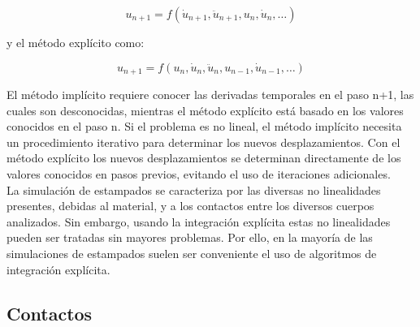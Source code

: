 \begin{equation}
u_{n+1}=f(\dot{u}_{n+1},\ddot{u}_{n+1},u_n,\dot{u}_n,…)
\end{equation}

y el método explícito como:

\begin{equation}
u_{n+1}=f(u_n,\dot{u}_n,\ddot{u}_n,u_{n-1},\dot{u}_{n-1},…)
\end{equation}

El método implícito requiere conocer las derivadas temporales en el paso n+1, las cuales son desconocidas, mientras el método explícito está basado en los valores conocidos en el paso n. Si el problema es no lineal, el método implícito necesita un procedimiento iterativo para determinar los nuevos desplazamientos. Con el método explícito los nuevos desplazamientos se determinan directamente de los valores conocidos en pasos previos, evitando el uso de iteraciones adicionales.\\

La simulación de estampados se caracteriza por las diversas no linealidades presentes, debidas al material, y a los contactos entre los diversos cuerpos analizados. Sin embargo, usando la integración explícita estas no linealidades pueden ser tratadas sin mayores problemas. Por ello, en la mayoría de las simulaciones de estampados suelen ser conveniente el uso de algoritmos de integración explícita.

\subsection{Contactos}








